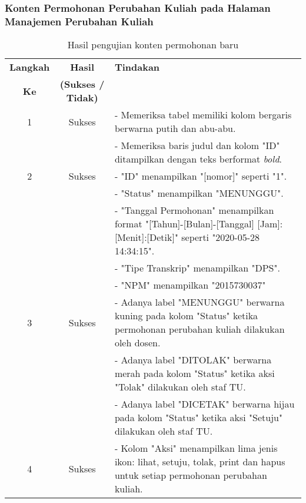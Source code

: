 \subsubsection{Konten Permohonan Perubahan Kuliah pada Halaman Manajemen Perubahan Kuliah}
\begin{table}[H]
	\centering 
	\caption{Hasil pengujian konten permohonan baru}
	\label{hasil:ManajemenPermohonanPerubahanKuliah}
	\begin{tabular}{|c| c| p{}|}
		\toprule
		\textbf{Langkah} & \textbf{Hasil} & \textbf{Tindakan}\\
		\textbf{Ke} & \textbf{(Sukses / Tidak)} &\\
		\midrule
		1&Sukses&- Memeriksa tabel memiliki kolom bergaris berwarna putih dan abu-abu.\\
		&& - Memeriksa baris judul dan kolom "ID" ditampilkan dengan teks berformat \textit{bold}.	\\	
		\hline
		2&Sukses&- "ID" menampilkan "[nomor]" seperti "1".\\
		&&- "Status" menampilkan "MENUNGGU".\\
		&&- "Tanggal Permohonan" menampilkan format "[Tahun]-[Bulan]-[Tanggal] [Jam]:[Menit]:[Detik]" seperti "2020-05-28 14:34:15".\\
		&&- "Tipe Transkrip" menampilkan "DPS".\\
		&&- "NPM" menampilkan "2015730037"\\
		\hline
		3&Sukses& - Adanya label "MENUNGGU" berwarna kuning  pada kolom "Status" ketika permohonan perubahan kuliah dilakukan oleh dosen.\\
		&& - Adanya label "DITOLAK" berwarna merah pada kolom "Status" ketika aksi "Tolak" dilakukan oleh staf TU.\\
		&& - Adanya label "DICETAK" berwarna hijau pada kolom "Status" ketika aksi "Setuju" dilakukan oleh staf TU.\\
		\hline
		4&Sukses&- Kolom "Aksi" menampilkan lima jenis ikon: lihat, setuju, tolak, print dan hapus untuk setiap permohonan perubahan kuliah.\\		
		\bottomrule		
	\end{tabular} 
\end{table}


